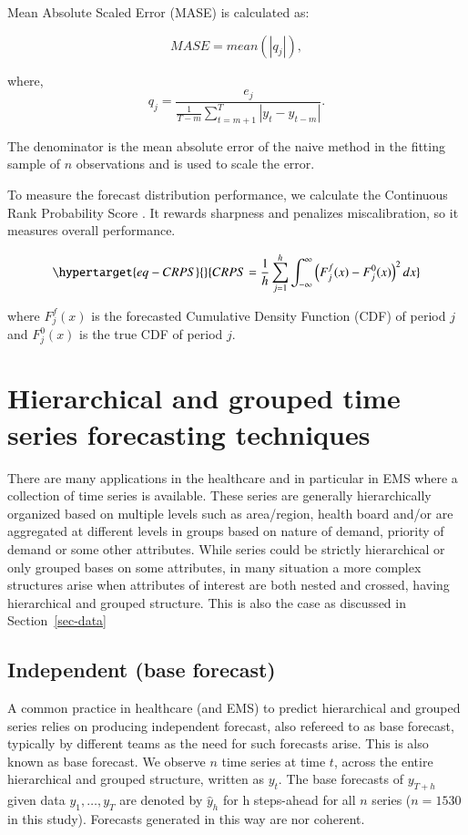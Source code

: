 \documentclass[
  authoryear,
  preprint,
  3p]{elsarticle}
\begin{document}
Mean Absolute Scaled Error (MASE) is calculated as:

\[
MASE = mean(|q_{j}|),
\]

where, \[
q_{j} = \frac{ e_{j}}
    {\frac{1}{T-m}\sum_{t=m+1}^T |y_{t}-y_{t-m}|}.
\]

The denominator is the mean absolute error of the naive method in the
fitting sample of \(n\) observations and is used to scale the error.

To measure the forecast distribution performance, we calculate the
Continuous Rank Probability Score \citep{gneiting2014probabilistic}. It
rewards sharpness and penalizes miscalibration, so it measures overall
performance.

\begin{equation}\protect\hypertarget{eq-CRPS}{}{
CRPS=\frac{1}{h} \sum_{j=1}^{h} \int_{-\infty}^{\infty} \left(F^f_j(x) - F^0_j(x)\right)^2dx
}\label{eq-CRPS}\end{equation}

where \(F^f_j(x)\) is the forecasted Cumulative Density Function (CDF)
of period \(j\) and \(F^0_j(x)\) is the true CDF of period \(j\).

\hypertarget{sec-htc}{%
\section{Hierarchical and grouped time series forecasting
techniques}\label{sec-htc}}

There are many applications in the healthcare and in particular in EMS
where a collection of time series is available. These series are
generally hierarchically organized based on multiple levels such as
area/region, health board and/or are aggregated at different levels in
groups based on nature of demand, priority of demand or some other
attributes. While series could be strictly hierarchical or only grouped
bases on some attributes, in many situation a more complex structures
arise when attributes of interest are both nested and crossed, having
hierarchical and grouped structure. This is also the case as discussed
in Section~\ref{sec-data}

\hypertarget{independent-base-forecast}{%
\subsection{Independent (base
forecast)}\label{independent-base-forecast}}

A common practice in healthcare (and EMS) to predict hierarchical and
grouped series relies on producing independent forecast, also refereed
to as base forecast, typically by different teams as the need for such
forecasts arise. This is also known as base forecast. We observe \(n\)
time series at time \(t\), across the entire hierarchical and grouped
structure, written as \(y_t\). The base forecasts of \(y_{T+h}\) given
data \(y_1,\dots,y_T\) are denoted by \(\hat{y}_h\) for h steps-ahead
for all \(n\) series (\(n=1530\) in this study). Forecasts generated in
this way are nor coherent.
\end{document}
